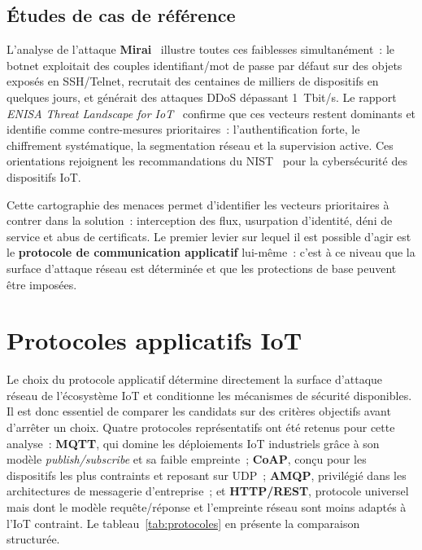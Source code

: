 \subsection{Études de cas de référence}

L'analyse de l'attaque \textbf{Mirai}~\cite{kolias2017mirai,antonakakis2017mirai} illustre toutes ces faiblesses simultanément~: le botnet exploitait des couples identifiant/mot de passe par défaut sur des objets exposés en SSH/Telnet, recrutait des centaines de milliers de dispositifs en quelques jours, et générait des attaques DDoS dépassant 1~Tbit/s. Le rapport \emph{ENISA Threat Landscape for IoT}~\cite{enisa_iot} confirme que ces vecteurs restent dominants et identifie comme contre-mesures prioritaires~: l'authentification forte, le chiffrement systématique, la segmentation réseau et la supervision active. Ces orientations rejoignent les recommandations du NIST~\cite{nist_sp800213} pour la cybersécurité des dispositifs IoT.

Cette cartographie des menaces permet d'identifier les vecteurs prioritaires à contrer dans la solution~: interception des flux, usurpation d'identité, déni de service et abus de certificats. Le premier levier sur lequel il est possible d'agir est le \textbf{protocole de communication applicatif} lui-même~: c'est à ce niveau que la surface d'attaque réseau est déterminée et que les protections de base peuvent être imposées.

\section{Protocoles applicatifs IoT}
\label{sec:ea-protocoles}

Le choix du protocole applicatif détermine directement la surface d'attaque réseau de l'écosystème IoT et conditionne les mécanismes de sécurité disponibles. Il est donc essentiel de comparer les candidats sur des critères objectifs avant d'arrêter un choix. Quatre protocoles représentatifs ont été retenus pour cette analyse~: \textbf{MQTT}, qui domine les déploiements IoT industriels grâce à son modèle \emph{publish/subscribe} et sa faible empreinte~; \textbf{CoAP}, conçu pour les dispositifs les plus contraints et reposant sur UDP~; \textbf{AMQP}, privilégié dans les architectures de messagerie d'entreprise~; et \textbf{HTTP/REST}, protocole universel mais dont le modèle requête/réponse et l'empreinte réseau sont moins adaptés à l'IoT contraint. Le tableau~\ref{tab:protocoles} en présente la comparaison structurée.


